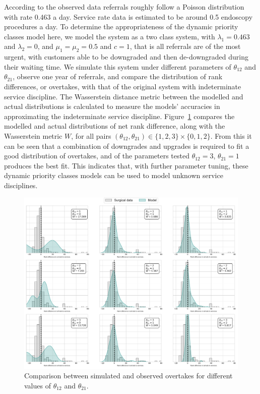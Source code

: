 \documentclass{article}
\begin{document}
According to the observed data referrals roughly follow a Poisson distribution
with rate 0.463 a day. Service rate data is estimated to be around 0.5
endoscopy procedures a day. To determine the appropriateness of the dynamic
priority classes model here, we model the system as a two class system, with
$\lambda_1 = 0.463$ and $\lambda_2 = 0$, and $\mu_1 = \mu_2 = 0.5$ and $c = 1$,
that is all referrals are of the most urgent, with customers able to be
downgraded and then de-downgraded during their waiting time. We simulate this
system under different parameters of $\theta_{12}$ and $\theta_{21}$, observe
one year of referrals, and compare the distribution of rank differences, or
overtakes, with that of the original system with indeterminate service
discipline. The Wasserstein distance metric \cite{mostafaei11} between the
modelled and actual distributions is calculated to measure the models'
accuracies in approximating the indeterminate service discipline.
Figure~\ref{fig:fitting_theta} compares the modelled and actual distributions of
net rank difference, along with the Wasserstein metric $W$, for all pairs
$\left(\theta_{12}, \theta_{21}\right) \in \{1, 2, 3\}\times\{0, 1, 2\}$. From
this it can be seen that a combination of downgrades and upgrades is required to
fit a good distribution of overtakes, and of the parameters tested
$\theta_{12}=3$, $\theta_{21}=1$ produces the best fit. This indicates that,
with further parameter tuning, these dynamic priority classes models can be used
to model unknown service disciplines.

\begin{figure}[!htbp]
  \begin{center}
    \includegraphics[width=\textwidth]{img/fitting_theta.pdf}
  \end{center}
  \caption{Comparison between simulated and observed overtakes for different
  values of $\theta_{12}$ and $\theta_{21}$.}
  \label{fig:fitting_theta}
\end{figure}




\end{document}
